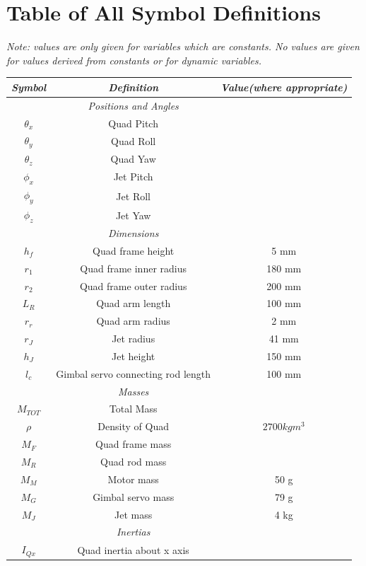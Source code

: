 \documentclass[11pt]{article}
\begin{document}
\section{Table of All Symbol Definitions}
\begin{center}
    \emph{Note: values are only given for variables which are constants. No values are given for values derived from constants or for dynamic variables.}
\begin{longtable}{|ccc|}
    \hline
    \emph{Symbol} & \emph{Definition} & \emph{Value(where appropriate)} \\
    \hline \endhead
    & \emph{Positions and Angles} & \\
    \hline
    $\theta_x$ & Quad Pitch & \\
    $\theta_y$ & Quad Roll & \\
    $\theta_z$ & Quad Yaw & \\
    $\phi_x$ & Jet Pitch & \\
    $\phi_y$ & Jet Roll & \\
    $\phi_z$ & Jet Yaw & \\
    \hline
    & \emph{Dimensions} & \\
    \hline
    $h_f$ & Quad frame height & 5 mm \\
    $r_1$ & Quad frame inner radius & 180 mm \\
    $r_2$ & Quad frame outer radius & 200 mm \\
    $L_R$ & Quad arm length & 100 mm \\
    $r_r$ & Quad arm radius & 2 mm \\
    $r_J$ & Jet radius & 41 mm \\
    $h_J$ & Jet height & 150 mm \\
    $l_c$ & Gimbal servo connecting rod length & 100 mm \\
    \hline
    & \emph{Masses} & \\
    \hline
    $M_{TOT}$ & Total Mass & \\
    $\rho$ & Density of Quad & $2700 kgm^3$ \\
    $M_F$ & Quad frame mass & \\
    $M_R$ & Quad rod mass & \\
    $M_M$ & Motor mass & 50 g \\
    $M_G$ & Gimbal servo mass & 79 g \\
    $M_J$ & Jet mass & 4 kg\\
    \hline
    & \emph{Inertias} & \\
    \hline
    $I_{Qx}$ & Quad inertia about x axis & \\

\end{longtable}
\end{center}
\end{document}
